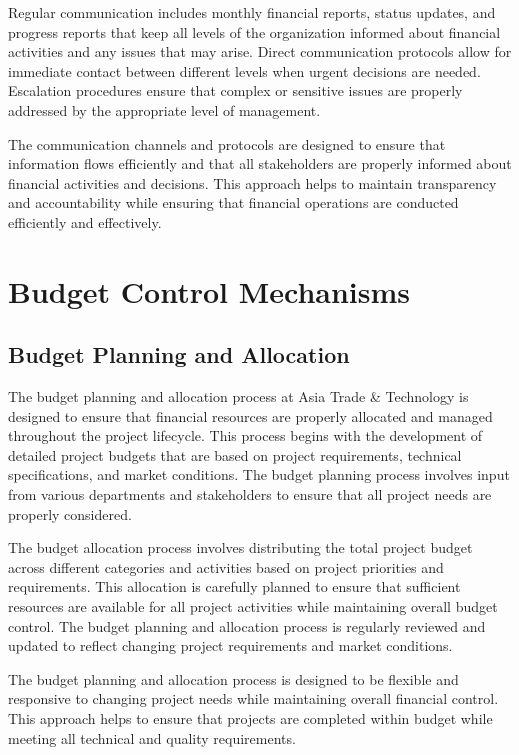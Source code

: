 Regular communication includes monthly financial reports, status updates, and progress reports that keep all levels of the organization informed about financial activities and any issues that may arise. Direct communication protocols allow for immediate contact between different levels when urgent decisions are needed. Escalation procedures ensure that complex or sensitive issues are properly addressed by the appropriate level of management.

The communication channels and protocols are designed to ensure that information flows efficiently and that all stakeholders are properly informed about financial activities and decisions. This approach helps to maintain transparency and accountability while ensuring that financial operations are conducted efficiently and effectively.

\section{Budget Control Mechanisms}

\subsection{Budget Planning and Allocation}
The budget planning and allocation process at Asia Trade \& Technology is designed to ensure that financial resources are properly allocated and managed throughout the project lifecycle. This process begins with the development of detailed project budgets that are based on project requirements, technical specifications, and market conditions. The budget planning process involves input from various departments and stakeholders to ensure that all project needs are properly considered.

The budget allocation process involves distributing the total project budget across different categories and activities based on project priorities and requirements. This allocation is carefully planned to ensure that sufficient resources are available for all project activities while maintaining overall budget control. The budget planning and allocation process is regularly reviewed and updated to reflect changing project requirements and market conditions.

The budget planning and allocation process is designed to be flexible and responsive to changing project needs while maintaining overall financial control. This approach helps to ensure that projects are completed within budget while meeting all technical and quality requirements.

